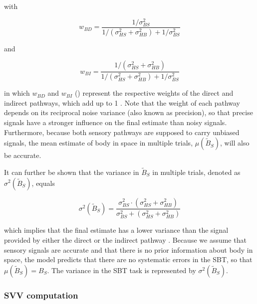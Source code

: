 with

\begin{equation}
\label{p1:eqn3}
w_{BD} = \frac{1/\sigma^2_{BS}}{1/(\sigma^2_{HS} + \sigma^2_{HB}) + 1/\sigma^2_{BS}}
\end{equation}

and

\begin{equation}
\label{p1:eqn4}
w_{BI} = \frac{1/(\sigma^2_{HS} + \sigma^2_{HB})}{1/(\sigma^2_{HS} + \sigma^2_{HB}) + 1/\sigma^2_{BS}}
\end{equation}

in which $w_{BD}$ and $w_{BI}$ () represent the respective weights of the direct and indirect pathways, which add up to 1 \cite{landy1995,jacobs1999,ernst2002,bays2007}. Note that the weight of each pathway depends on its reciprocal noise variance (also known as precision), so that precise signals have a stronger influence on the final estimate than noisy signals. Furthermore, because both sensory pathways are supposed to carry unbiased signals, the mean estimate of body in space in multiple trials, $\mu(\tilde{B}_S)$, will also be accurate. 

It can further be shown that the variance in $\tilde{B}_S$ in multiple trials, denoted as $\sigma^2(\tilde{B}_S)$, equals 

\begin{equation}
\label{p1:eqn5}
\sigma^2(\tilde{B}_S) = \frac{
\sigma^2_{BS} \cdot (\sigma^2_{HS} + \sigma^2_{HB})
}{
\sigma^2_{BS} + (\sigma^2_{HS} + \sigma^2_{HB})
}
\end{equation}

which implies that the final estimate has a lower variance than the signal provided by either the direct or the indirect pathway \cite{ernst2002,ernst2004}. Because we assume that sensory signals are accurate and that there is no prior information about body in space, the model predicts that there are no systematic errors in the SBT, so that $\mu(\tilde{B}_S) = B_S$. The variance in the SBT task is represented by $\sigma^2(\tilde{B}_S)$. 

\subsubsection{SVV computation}

